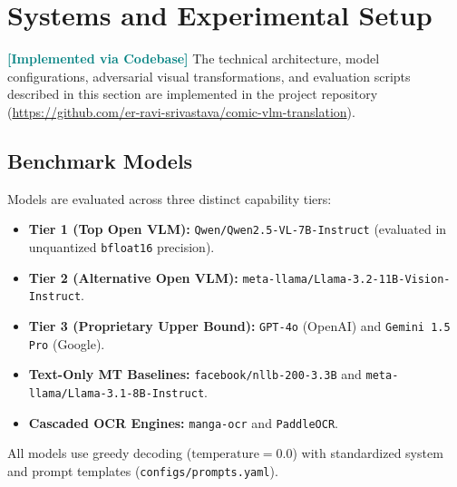 \documentclass[11pt,a4paper]{article}
\begin{document}
\section{Systems and Experimental Setup}
\label{sec:experimental_setup}

\begin{workingnote}
\textcolor{teal}{\textbf{[Implemented via Codebase]}} The technical architecture, model configurations, adversarial visual transformations, and evaluation scripts described in this section are implemented in the project repository (\url{https://github.com/er-ravi-srivastava/comic-vlm-translation}).
\end{workingnote}

\subsection{Benchmark Models}
Models are evaluated across three distinct capability tiers:
\begin{itemize}[leftmargin=*,noitemsep]
    \item \textbf{Tier 1 (Top Open VLM):} \texttt{Qwen/Qwen2.5-VL-7B-Instruct} (evaluated in unquantized \texttt{bfloat16} precision).
    \item \textbf{Tier 2 (Alternative Open VLM):} \texttt{meta-llama/Llama-3.2-11B-Vision-Instruct}.
    \item \textbf{Tier 3 (Proprietary Upper Bound):} \texttt{GPT-4o} (OpenAI) and \texttt{Gemini 1.5 Pro} (Google).
    \item \textbf{Text-Only MT Baselines:} \texttt{facebook/nllb-200-3.3B} and \texttt{meta-llama/Llama-3.1-8B-Instruct}.
    \item \textbf{Cascaded OCR Engines:} \texttt{manga-ocr} and \texttt{PaddleOCR}.
\end{itemize}
All models use greedy decoding ($\text{temperature} = 0.0$) with standardized system and prompt templates (\texttt{configs/prompts.yaml}).
\end{document}
